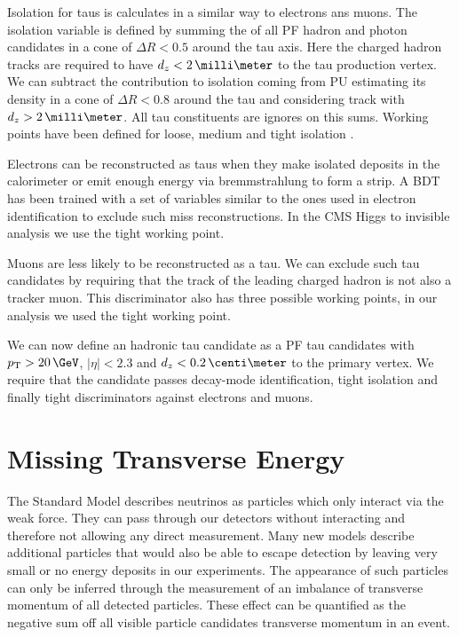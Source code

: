 Isolation for taus is calculates in a similar way to electrons ans muons. The isolation variable is defined by summing the \pt of all \gls{PF} hadron and photon candidates in a cone of $\Delta R < 0.5$ around the tau axis. Here the charged hadron tracks are required to have $d_z < 2\,\milli\meter$ to the tau production vertex. We can subtract the contribution to isolation coming from \gls{PU} estimating its density in a cone of $\Delta R < 0.8$ around the tau and considering track with $d_z > 2\,\milli\meter$. All tau constituents are ignores on this sums. Working points have been defined for loose, medium and tight isolation \cite{ARTICLE:CMSReconstructionIndentificationTau}. 

Electrons can be reconstructed as taus when they make isolated deposits in the calorimeter or emit enough energy via bremmstrahlung to form a strip. A \gls{BDT} has been trained with a set of variables similar to the ones used in electron identification to exclude such miss reconstructions. In the \gls{CMS} Higgs to invisible analysis we use the tight working point.

Muons are less likely to be reconstructed as a tau. We can exclude such tau candidates by requiring that the track of the leading charged hadron is not also a tracker muon. This discriminator also has three possible working points, in our analysis we used the tight working point.

We can now define an hadronic tau candidate as a \gls{PF} tau candidates with $\pt > 20 \,\GeV$, $|\eta|<2.3$ and $d_z<0.2 \,\centi\meter$ to the primary vertex. We require that the candidate passes decay-mode identification, tight isolation and finally tight discriminators against electrons and muons.

\section{Missing Transverse Energy}
\label{SECTION:EventReconstructionPhysicsObjects_MET}


The Standard Model describes neutrinos as particles which only interact via the weak force. They can pass through our detectors without interacting and therefore not allowing any direct measurement. Many new models describe additional particles that would also be able to escape detection by leaving very small or no energy deposits in our experiments. The appearance of such particles can only be inferred through the measurement of an imbalance of transverse momentum of all detected particles. These effect can be quantified as the negative sum off all visible particle candidates transverse momentum in an event. 

